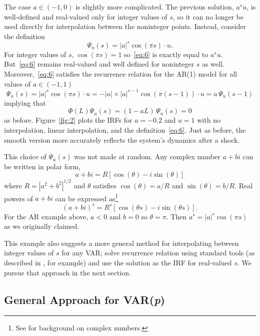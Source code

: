 \documentclass[AER,reviewmode]{tex/AEA}
\begin{document}
The case $a \in (-1, 0)$ is slightly more complicated.  The previous
solution, $a^s u$, is well-defined and real-valued only for integer
values of $s$, so it can no longer be used directly for interpolation
between the noninteger points. Instead, consider the definition
\begin{equation}
  \label{eq:6}
  \Psi_u(s) = |a|^s \cos(\pi s) \cdot u.
\end{equation}
For integer values of $s$, $\cos(\pi s) = 1$ so~\eqref{eq:6} is
exactly equal to $a^s u$. But~\eqref{eq:6} remains real-valued and
well defined for noninteger $s$ as well. Moreover,~\eqref{eq:6}
satisfies the recurrence relation for the AR(1) model for all values
of $a \in (-1,1)$
\begin{equation*}
  \Psi_u(s) = |a|^s \cos(\pi s) \cdot u = - |a| \times |a|^{s-1} \cos(\pi (s-1)) \cdot u = a \, \Psi_u(s-1)
\end{equation*}
implying that
\begin{equation*}
  \Phi(L) \Psi_u(s) = (1 - a L) \, \Psi_u(s) = 0
\end{equation*}
as before. Figure~\ref{fig:2} plots the IRFs for $a = -0.2$ and
$u = 1$ with no interpolation, linear interpolation, and the
definition~\eqref{eq:6}. Just as before, the smooth version more
accurately reflects the system's dynamics after a shock.

This choice of $\Psi_u(s)$ was not made at random. Any complex
number $a + bi$ can be written in polar form,
\[
a + bi = R [\cos(\theta) - i \sin(\theta)]
\]
where $R = |a^2 + b^2|^{1/2}$ and $\theta$ satisfies
$\cos(\theta) = a/R$ and $\sin(\theta) = b/R$. Real powers of $a + bi$
can be expressed as\footnote{%
  See \citet{Ham:94} for background on complex numbers.} %
\[
(a + bi)^s = R^s [\cos(\theta s) - i \sin(\theta s)].
\]
For the AR example above, $a < 0$ and $b = 0$ so $\theta = \pi$.
Then $a^s = |a|^s \cos(\pi s)$ as we originally claimed.

This example also suggests a more general method for interpolating
between integer values of $s$ for any VAR; solve recurrence relation
using standard tools (as described in \citealp{Ham:94}, for example)
and use the solution as the IRF for real-valued $s$. We pursue that
approach in the next section.

\subsection{General Approach for VAR(\textit{p})}
\label{S2.2}
\end{document}
